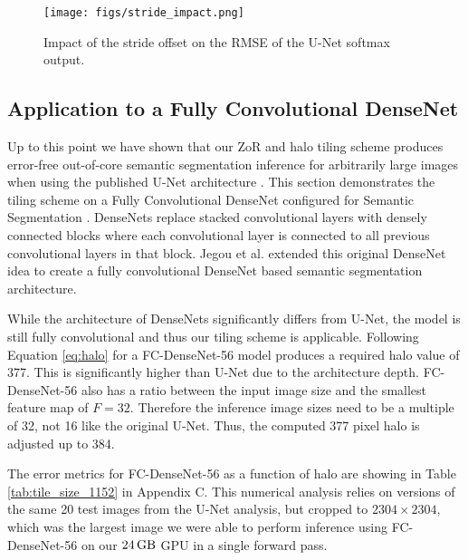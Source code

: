 \documentclass[10pt, indentfirst]{article}
\begin{document}

\begin{figure}
	\centering
	\texttt{[image: figs/stride\_impact.png]}
	\caption{Impact of the stride offset on the RMSE of the U-Net softmax output.}
	\label{fig:stride-impact}
\end{figure} 

\subsection{Application to a Fully Convolutional DenseNet}

Up to this point we have shown that our ZoR and halo tiling scheme produces error-free out-of-core semantic segmentation inference for arbitrarily large images when using the published U-Net architecture \citep{Ronneberger2015a}. 
This section demonstrates the tiling scheme on a Fully Convolutional DenseNet configured for Semantic Segmentation \citep{Jegou2017}. DenseNets \citep{Huang2017} replace stacked convolutional layers with densely connected blocks where each convolutional layer is connected to all previous convolutional layers in that block. Jegou et al. \citep{Jegou2017} extended this original DenseNet idea to create a fully convolutional DenseNet based semantic segmentation architecture. 

While the architecture of DenseNets significantly differs from U-Net, the model is still fully convolutional and thus our tiling scheme is applicable. Following Equation \ref{eq:halo} for a FC-DenseNet-56 \citep{Jegou2017} model produces a required halo value of 377. This is significantly higher than U-Net due to the architecture depth. FC-DenseNet-56 also has a ratio between the input image size and the smallest feature map of $F = 32$. Therefore the inference image sizes need to be a multiple of 32, not 16 like the original U-Net. Thus, the computed 377 pixel halo is adjusted up to 384. 

The error metrics for FC-DenseNet-56 as a function of halo are showing in Table \ref{tab:tile_size_1152} in Appendix C. This numerical analysis relies on versions of the same 20 test images from the U-Net analysis, but cropped to $\num{2304} \times \num{2304}$, which was the largest image we were able to perform inference using FC-DenseNet-56 on our $\SI{24}{\giga\byte}$ GPU in a single forward pass. 
\end{document}
